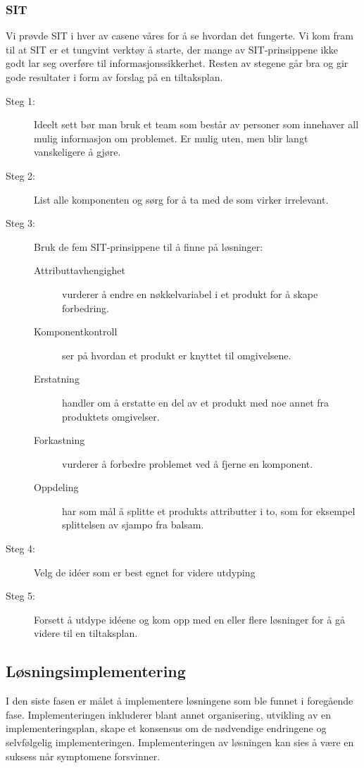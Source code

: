 \subsubsection{SIT} 
Vi prøvde SIT i hver av casene våres for å se hvordan det fungerte. Vi kom fram til at SIT er et tungvint verktøy å starte, der mange av SIT-prinsippene ikke godt lar seg overføre til informasjonssikkerhet. Resten av stegene går bra og gir gode resultater i form av forslag på en tiltaksplan.  
    \begin{description}
        \item[Steg 1:] Ideelt sett bør man bruk et team som består av personer som innehaver all mulig informasjon om problemet. Er mulig uten, men blir langt vanskeligere å gjøre.
        \item[Steg 2:] List alle komponenten og sørg for å ta med de som virker irrelevant. 
        \item[Steg 3:] Bruk de fem SIT-prinsippene til å finne på løsninger:
                \begin{description}
                    \item[Attributtavhengighet] vurderer å endre en nøkkelvariabel i et produkt for å skape forbedring.
                    \item[Komponentkontroll] ser på hvordan et produkt er knyttet til omgivelsene.
                    \item[Erstatning] handler om å erstatte en del av et produkt med noe annet fra produktets omgivelser.
                    \item[Forkastning] vurderer å forbedre problemet ved å fjerne en komponent. 
                    \item[Oppdeling] har som mål å splitte et produkts attributter i to, som for eksempel splittelsen av sjampo fra balsam.
                \end{description}
        \item[Steg 4:] Velg de idéer som er best egnet for videre utdyping
        \item[Steg 5:] Forsett å utdype idéene og kom opp med en eller flere løsninger for å gå videre til en tiltaksplan.
    \end{description}

\subsection{Løsningsimplementering}
I den siste fasen er målet å implementere løsningene som ble funnet i foregående fase. Implementeringen inkluderer blant annet organisering, utvikling av en implementeringsplan, skape et konsensus om de nødvendige endringene og selvfølgelig implementeringen. Implementeringen av løsningen kan sies å være en suksess når symptomene forsvinner. 

